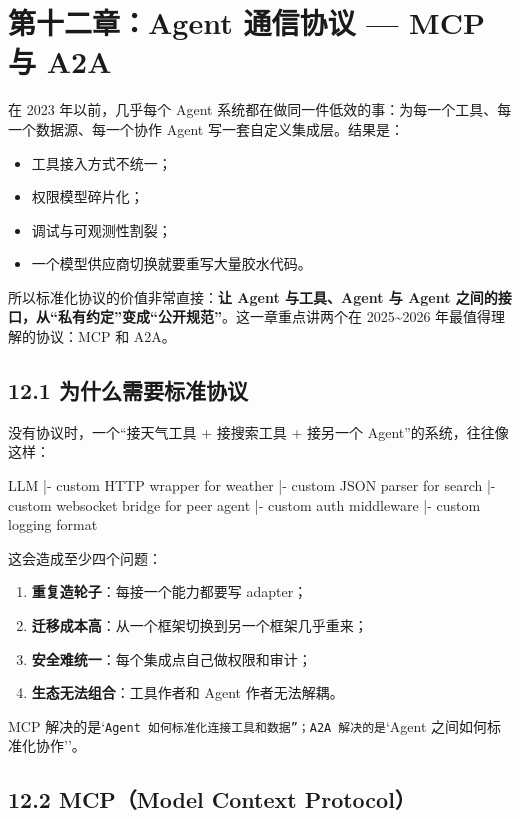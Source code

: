 \chapter{第十二章：Agent 通信协议 --- MCP 与 A2A}

在 2023 年以前，几乎每个 Agent 系统都在做同一件低效的事：为每一个工具、每一个数据源、每一个协作 Agent 写一套自定义集成层。结果是：


\begin{itemize}[leftmargin=2em]
\item 工具接入方式不统一；
\item 权限模型碎片化；
\item 调试与可观测性割裂；
\item 一个模型供应商切换就要重写大量胶水代码。
\end{itemize}

所以标准化协议的价值非常直接：\textbf{让 Agent 与工具、Agent 与 Agent 之间的接口，从“私有约定”变成“公开规范”}。这一章重点讲两个在 2025\textasciitilde{}2026 年最值得理解的协议：MCP 和 A2A。


\section{12.1 为什么需要标准协议}

没有协议时，一个``接天气工具 + 接搜索工具 + 接另一个 Agent''的系统，往往像这样：


\begin{codeblock}
LLM
 |- custom HTTP wrapper for weather
 |- custom JSON parser for search
 |- custom websocket bridge for peer agent
 |- custom auth middleware
 |- custom logging format
\end{codeblock}

这会造成至少四个问题：


\begin{enumerate}[leftmargin=2em]
\item \textbf{重复造轮子}：每接一个能力都要写 adapter；
\item \textbf{迁移成本高}：从一个框架切换到另一个框架几乎重来；
\item \textbf{安全难统一}：每个集成点自己做权限和审计；
\item \textbf{生态无法组合}：工具作者和 Agent 作者无法解耦。
\end{enumerate}

MCP 解决的是`\texttt{Agent 如何标准化连接工具和数据''；A2A 解决的是}`Agent 之间如何标准化协作''。


\section{12.2 MCP（Model Context Protocol）}

